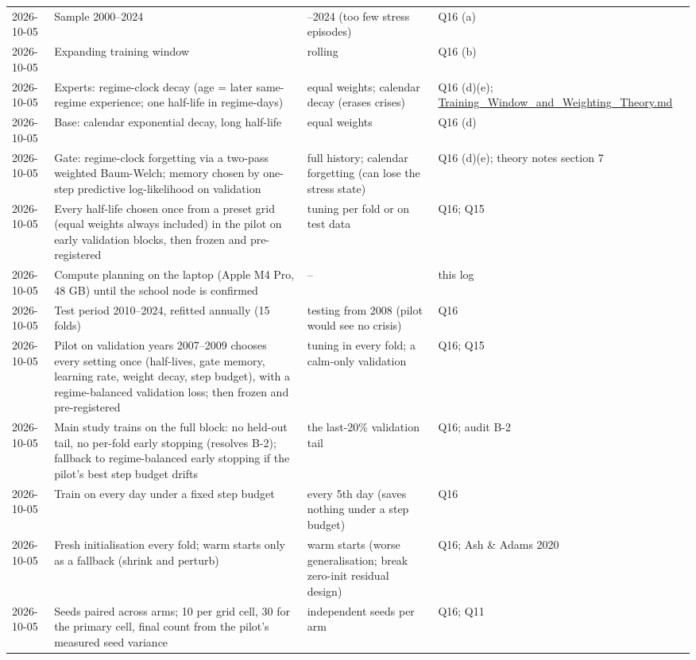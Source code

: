 {\begin{longtable}{@{}p{1.55cm}>{\raggedright\arraybackslash}p{6.6cm}>{\raggedright\arraybackslash}p{4.2cm}>{\raggedright\arraybackslash}p{2.6cm}@{}}
2026-10-05 & Sample 2000--2024 & 2015--2024 (too few stress episodes) & Q16 (a)\\
2026-10-05 & Expanding training window & rolling & Q16 (b)\\
2026-10-05 & Experts: regime-clock decay (age = later same-regime experience; one half-life in regime-days) & equal weights; calendar decay (erases crises) & Q16 (d)(e); \url{Training_Window_and_Weighting_Theory.md}\\
2026-10-05 & Base: calendar exponential decay, long half-life & equal weights & Q16 (d)\\
2026-10-05 & Gate: regime-clock forgetting via a two-pass weighted Baum-Welch; memory chosen by one-step predictive log-likelihood on validation & full history; calendar forgetting (can lose the stress state) & Q16 (d)(e); theory notes section 7\\
2026-10-05 & Every half-life chosen once from a preset grid (equal weights always included) in the pilot on early validation blocks, then frozen and pre-registered & tuning per fold or on test data & Q16; Q15\\
2026-10-05 & Compute planning on the laptop (Apple M4 Pro, 48 GB) until the school node is confirmed & -- & this log\\
2026-10-05 & Test period 2010--2024, refitted annually (15 folds) & testing from 2008 (pilot would see no crisis) & Q16\\
2026-10-05 & Pilot on validation years 2007--2009 chooses every setting once (half-lives, gate memory, learning rate, weight decay, step budget), with a regime-balanced validation loss; then frozen and pre-registered & tuning in every fold; a calm-only validation & Q16; Q15\\
2026-10-05 & Main study trains on the full block: no held-out tail, no per-fold early stopping (resolves B-2); fallback to regime-balanced early stopping if the pilot's best step budget drifts & the last-20\% validation tail & Q16; audit B-2\\
2026-10-05 & Train on every day under a fixed step budget & every 5th day (saves nothing under a step budget) & Q16\\
2026-10-05 & Fresh initialisation every fold; warm starts only as a fallback (shrink and perturb) & warm starts (worse generalisation; break zero-init residual design) & Q16; Ash \& Adams 2020\\
2026-10-05 & Seeds paired across arms; 10 per grid cell, 30 for the primary cell, final count from the pilot's measured seed variance & independent seeds per arm & Q16; Q11\\

\end{longtable}}
